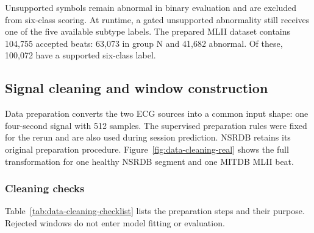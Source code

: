 Unsupported symbols remain abnormal in binary evaluation and are excluded
from six-class scoring. At runtime, a gated unsupported abnormality still
receives one of the five available subtype labels. The prepared MLII dataset contains 104,755 accepted beats: 63,073
in group N and 41,682 abnormal. Of these, 100,072 have a supported six-class label.

\subsection{Signal cleaning and window construction}

Data preparation converts the two ECG sources into a common input shape: one four-second signal with 512 samples. The supervised preparation rules were fixed for the rerun and are also used
during session prediction. NSRDB retains its original preparation procedure.
Figure~\ref{fig:data-cleaning-real} shows the full transformation for one
healthy NSRDB segment and one MITDB MLII beat.

\subsubsection{Cleaning checks}

Table~\ref{tab:data-cleaning-checklist} lists the preparation steps and their
purpose. Rejected windows do not enter model fitting or evaluation.

